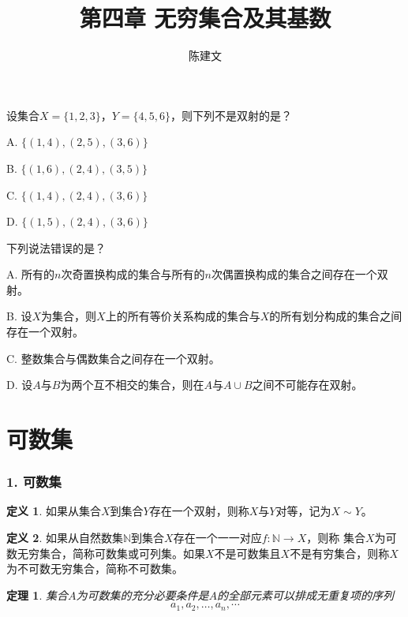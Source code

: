 \documentclass{beamer}
\begin{document}
\begin{CJK*}{UTF8}{gbsn}

\newtheorem*{Thm}{定理}
\newtheorem*{Cor}{推论}
\newtheorem{Ax}{公理}[section]
\theoremstyle{definition}
\newtheorem*{Def}{定义}
\newtheorem*{Defofset}{集合的定义}

\theoremstyle{example}
\newtheorem*{Ex}{例：}
\newtheorem*{Exercise}{习题：}
\date{}
\author{陈建文}

\title{第四章 无穷集合及其基数}
\begin{frame}
  \titlepage
\end{frame}  
\begin{frame}
  设集合$X=\{1,2,3\}$，$Y=\{4,5,6\}$，则下列不是双射的是？

  A. $\{(1,4),(2,5),(3,6)\}$

  B. $\{(1,6),(2,4),(3,5)\}$

  C. $\{(1,4),(2,4),(3,6)\}$

  D. $\{(1,5),(2,4),(3,6)\}$
\end{frame}

\begin{frame}
  下列说法错误的是？

  A. 所有的$n$次奇置换构成的集合与所有的$n$次偶置换构成的集合之间存在一个双射。

  B. 设$X$为集合，则$X$上的所有等价关系构成的集合与$X$的所有划分构成的集合之间存在一个双射。

  C. 整数集合与偶数集合之间存在一个双射。

  D. 设$A$与$B$为两个互不相交的集合，则在$A$与$A\cup B$之间不可能存在双射。
\end{frame}


\section{可数集}
\begin{frame}[t]
  \frametitle{1. 可数集}
  \begin{Def}
    如果从集合$X$到集合$Y$存在一个双射，则称$X$与$Y$\alert{对等}，记为$X \sim Y$。
  \end{Def}\pause
  \begin{Def}
    如果从自然数集$\mathbb{N}$到集合$X$存在一个一一对应$f:\mathbb{N}\to X$，则称
    集合$X$为可数无穷集合，简称\alert{可数集}或\alert{可列集}。如果$X$不是可数集且$X$不是有穷集合，则称$X$为不可数无穷集合，简称\alert{不可数集}。
  \end{Def}\pause
  \begin{Thm}
    集合$A$为可数集的充分必要条件是$A$的全部元素可以排成无重复项的序列
    \[a_1, a_2, \ldots, a_n, \cdots\]
  \end{Thm}
\end{frame}


\end{CJK*}
\end{document}
